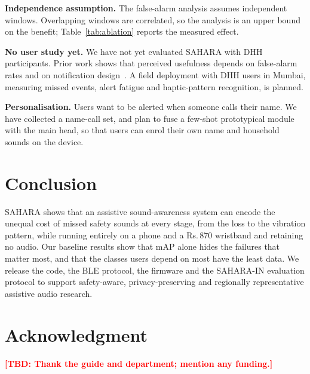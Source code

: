 \documentclass[conference]{IEEEtran}
\newcommand{\TBD}[1]{\textcolor{red}{\textbf{[TBD: #1]}}}
\newcommand{\INR}{Rs.\,}
\begin{document}
\textbf{Independence assumption.} The false-alarm analysis assumes independent windows. Overlapping windows are correlated, so the analysis is an upper bound on the benefit; Table~\ref{tab:ablation} reports the measured effect.

\textbf{No user study yet.} We have not yet evaluated SAHARA with DHH participants. Prior work shows that perceived usefulness depends on false-alarm rates and on notification design~\cite{jain2020homesound,findlater2019}. A field deployment with DHH users in Mumbai, measuring missed events, alert fatigue and haptic-pattern recognition, is planned.

\textbf{Personalisation.} Users want to be alerted when someone calls their name. We have collected a name-call set, and plan to fuse a few-shot prototypical module~\cite{snell2017,jain2022protosound} with the main head, so that users can enrol their own name and household sounds on the device.

\section{Conclusion}
SAHARA shows that an assistive sound-awareness system can encode the unequal cost of missed safety sounds at every stage, from the loss to the vibration pattern, while running entirely on a phone and a \INR870 wristband and retaining no audio. Our baseline results show that mAP alone hides the failures that matter most, and that the classes users depend on most have the least data. We release the code, the BLE protocol, the firmware and the SAHARA-IN evaluation protocol to support safety-aware, privacy-preserving and regionally representative assistive audio research.

\section*{Acknowledgment}
\TBD{Thank the guide and department; mention any funding.}
\end{document}
